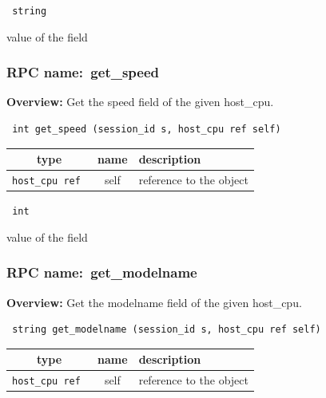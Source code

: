 \vspace{0.3cm}

{\tt 
string
}


value of the field
\vspace{0.3cm}
\vspace{0.3cm}
\vspace{0.3cm}
\subsubsection{RPC name:~get\_speed}

{\bf Overview:} 
Get the speed field of the given host\_cpu.

\begin{verbatim} int get_speed (session_id s, host_cpu ref self)\end{verbatim}



 
\vspace{0.3cm}
\begin{tabular}{|c|c|p{7cm}|}
 \hline
{\bf type} & {\bf name} & {\bf description} \\ \hline
{\tt host\_cpu ref } & self & reference to the object \\ \hline 

\end{tabular}

\vspace{0.3cm}

{\tt 
int
}


value of the field
\vspace{0.3cm}
\vspace{0.3cm}
\vspace{0.3cm}
\subsubsection{RPC name:~get\_modelname}

{\bf Overview:} 
Get the modelname field of the given host\_cpu.

\begin{verbatim} string get_modelname (session_id s, host_cpu ref self)\end{verbatim}



 
\vspace{0.3cm}
\begin{tabular}{|c|c|p{7cm}|}
 \hline
{\bf type} & {\bf name} & {\bf description} \\ \hline
{\tt host\_cpu ref } & self & reference to the object \\ \hline 

\end{tabular}

